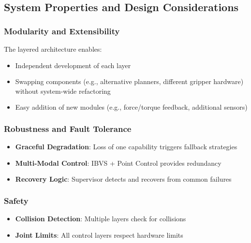 \subsection{System Properties and Design Considerations}
\label{subsec:system_properties}

\subsubsection{Modularity and Extensibility}
The layered architecture enables:
\begin{itemize}
    \item Independent development of each layer
    \item Swapping components (e.g., alternative planners, different gripper hardware) without system-wide refactoring
    \item Easy addition of new modules (e.g., force/torque feedback, additional sensors)
\end{itemize}

\subsubsection{Robustness and Fault Tolerance}
\begin{itemize}
    \item \textbf{Graceful Degradation}: Loss of one capability triggers fallback strategies
    \item \textbf{Multi-Modal Control}: IBVS + Point Control provides redundancy
    \item \textbf{Recovery Logic}: Supervisor detects and recovers from common failures
\end{itemize}

\subsubsection{Safety}
\begin{itemize}
    \item \textbf{Collision Detection}: Multiple layers check for collisions
    \item \textbf{Joint Limits}: All control layers respect hardware limits
\end{itemize}

